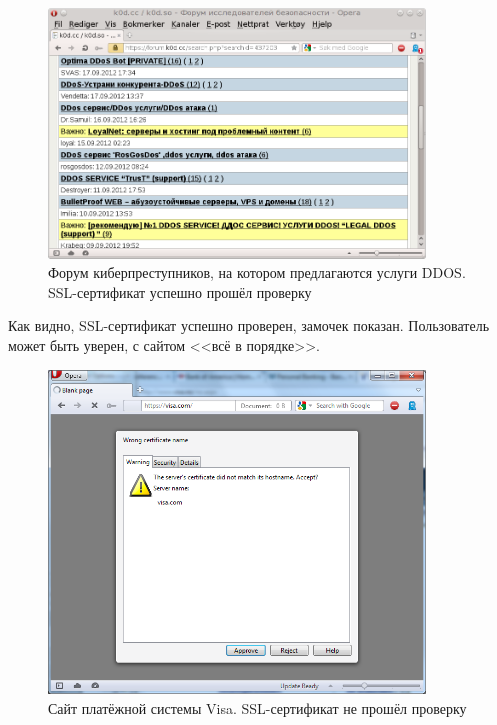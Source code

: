 \documentclass[10pt, a5paper]{article}
\begin{document}
\begin{center}

\begin{figure}[!h]
  \centering
  \includegraphics[width=10cm]{Hlebnikov2.png}
 \caption{Форум киберпреступников, на котором предлагаются услуги DDOS. SSL-сертификат успешно прошёл проверку}

  \label{Hlebnikov2}
\end{figure}

\end{center}

Как видно, SSL-сертификат успешно проверен, замочек показан.
Пользователь может быть уверен, с сайтом <<всё в порядке>>.


\begin{center}
\begin{figure}[!h]
  \centering
  \includegraphics[width=10cm]{Hlebnikov3.png}
  \caption{Сайт платёжной системы Visa. SSL-сертификат не прошёл проверку}
  \label{Hlebnikov3}
\end{figure}
\end{center}
\end{document}
